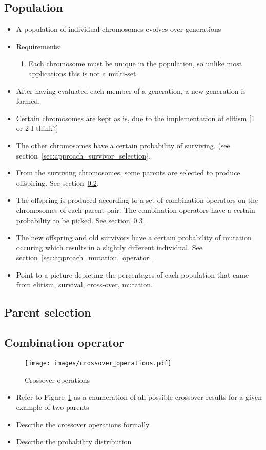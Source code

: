 \subsection{Population}
\begin{itemize}
	\item A population of individual chromosomes evolves over generations
	\item Requirements:
		\begin{enumerate}
			\item Each chromosome must be unique in the population, so unlike
				most applications this is not a multi-set.
		\end{enumerate}
	\item After having evaluated each member of a generation, a new generation
		is formed.
	\item Certain chromosomes are kept as is, due to the implementation of elitism
		[1 or 2 I think?]
	\item The other chromosomes have a certain probability of surviving. (see
		section~\ref{sec:approach_survivor_selection}.
	\item From the surviving chromosomes, some parents are selected to produce
		offspiring. See section~\ref{sec:approach_parent_selection}.
	\item The offspring is produced according to a set of combination operators
		on the chromosomes of each parent pair. The combination operators have
		a certain probability to be picked. See
		section~\ref{sec:approach_combination_operator}.
	\item The new offspring and old survivors have a certain probability of
		mutation occuring which results in a slightly different individual. See
		section~\ref{sec:approach_mutation_operator}.
	\item Point to a picture depicting the percentages of each population that
		came from elitism, survival, cross-over, mutation.
\end{itemize}
\subsection{Parent selection}
\label{sec:approach_parent_selection}
\subsection{Combination operator}
\label{sec:approach_combination_operator}
\begin{figure}[ht!]
	\centering
	\texttt{[image: images/crossover\_operations.pdf]}
	\caption[Crossover operations]{Crossover operations}
	\label{fig:crossover_operations}
\end{figure}
\begin{itemize}
	\item Refer to Figure~\ref{fig:crossover_operations} as a enumeration of
		all possible crossover results for a given example of two parents
	\item Describe the crossover operations formally
	\item Describe the probability distribution
\end{itemize}
